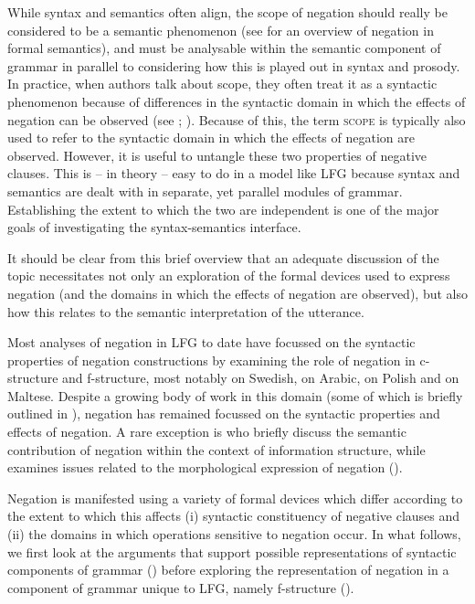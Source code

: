 \documentclass[output=paper,hidelinks]{langscibook}
\begin{document}
While syntax and semantics often align, the scope of negation should really be considered to be a semantic phenomenon (see \citealt{Penka:16} for an overview of negation in formal semantics), and must be analysable within the semantic component of grammar in parallel to considering how this is played out in syntax and prosody. In practice, when authors talk about scope, they often treat it as a syntactic phenomenon because of differences in the syntactic domain in which the effects of negation can be observed (see \citealt {Reinhart:79}; \citealt {Szabolcsi:11}). Because of this, the term \textsc{scope} is typically also used to refer to the syntactic domain in which the effects of negation are observed. However, it is useful to untangle these two properties of negative clauses. This is  -- in theory -- easy to do in a model like LFG because syntax and semantics are dealt with in separate, yet parallel modules of grammar. Establishing the extent to which the two are independent is one of the major goals of investigating the syntax-semantics interface.

It should be clear from this brief overview that an adequate discussion of the topic necessitates not only an exploration of the formal devices used to express negation (and the domains in which the effects of negation are observed), but also how this relates to the semantic interpretation of the utterance.

Most analyses of negation in LFG to date have focussed on the syntactic properties of negation constructions by examining the role of negation in c-structure and f-structure, most notably \citet{sellsneg} on Swedish, \citet{AlsharifSadler:09} on Arabic, \citet {przepiorkowski2015two} on Polish and \citet {camilleri-sadler:2017} on Maltese. Despite a growing body of work in this domain (some of which is briefly outlined in \citealt [67--69]{DLM:LFG}), negation has remained focussed on the syntactic properties and effects of negation. A rare exception is \citet {DN} who briefly discuss the semantic contribution of negation within the context of information structure, while \citet{Bond2016} examines issues related to the morphological expression of negation (). 

Negation is manifested using a variety of formal devices which differ according to the extent to which this affects (i) syntactic constituency of negative clauses and (ii) the domains in which operations sensitive to negation occur. In what follows, we first look at the arguments that support possible representations of syntactic components of grammar () before exploring the representation of negation in a component of grammar unique to LFG, namely f-structure ().
\end{document}
